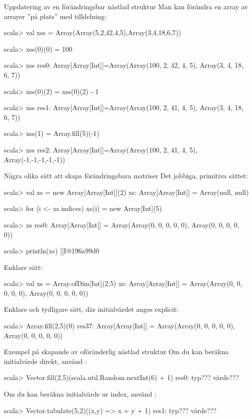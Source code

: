 \begin{Slide}{Uppdatering av en förändringsbar nästlad struktur}
Man kan förändra en array av arrayer ''på plats'' med tilldelning:
\begin{REPL}
scala> val xss = Array(Array(5,2,42,4,5),Array(3,4,18,6,7))

scala> xss(0)(0) = 100

scala> xss
res0: Array[Array[Int]]=Array(Array(100, 2, 42, 4, 5), Array(3, 4, 18, 6, 7))

scala> xss(0)(2) = xss(0)(2) - 1

scala> xss
res1: Array[Array[Int]]=Array(Array(100, 2, 41, 4, 5), Array(3, 4, 18, 6, 7))

scala> xss(1) = Array.fill(5)(-1)

scala> xss
res2: Array[Array[Int]]=Array(Array(100, 2, 41, 4, 5), Array(-1,-1,-1,-1,-1))
\end{REPL}
\end{Slide}

\begin{Slide}{Några olika sätt att skapa förändringsbara matriser}\SlideFontSmall
Det jobbiga, primitiva sättet:
\begin{REPL}
scala> val xs = new Array[Array[Int]](2)
xs: Array[Array[Int]] = Array(null, null)

scala> for (i <- xs.indices) {xs(i) = new Array[Int](5)}

scala> xs
res0: Array[Array[Int]] = Array(Array(0, 0, 0, 0, 0), Array(0, 0, 0, 0, 0))

scala> println(xs)
[[I@196a99d0
\end{REPL}
Enklare sätt:
\begin{REPL}
scala> val xs = Array.ofDim[Int](2,5)
xs: Array[Array[Int]] = Array(Array(0, 0, 0, 0, 0), Array(0, 0, 0, 0, 0))
\end{REPL}
Enklare och tydligare sätt, där initialvärdet anges explicit:
\begin{REPL}
scala> Array.fill(2,5)(0)
res37: Array[Array[Int]] = Array(Array(0, 0, 0, 0, 0), Array(0, 0, 0, 0, 0))
\end{REPL}

\end{Slide}

\begin{Slide}{Exempel på skapande av oföränderlig nästlad struktur}\SlideFontSmall
Om du kan beräkna initialvärde direkt, använd :\\
{\SlideFontTiny{}}
\begin{REPL}
scala> Vector.fill(2,5)(scala.util.Random.nextInt(6) + 1)
res0:
  typ???
  värde???

\end{REPL}
Om du kan beräkna initialvärde ur index, använd :\\
{\SlideFontTiny{}}
\begin{REPL}
scala> Vector.tabulate(5,2)((x,y) => x + y + 1)
res1:
  typ???
  värde???

\end{REPL}
\end{Slide}

